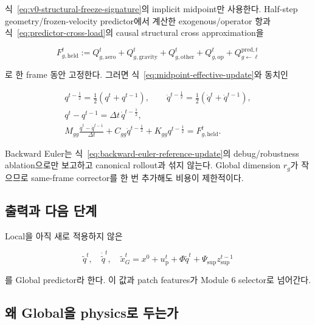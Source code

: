 \documentclass[11pt,a4paper]{article}
\begin{document}
식~\eqref{eq:v0-structural-freeze-signature}의 implicit midpoint만 사용한다.
Half-step geometry/frozen-velocity predictor에서 계산한 exogenous/operator 항과
식~\eqref{eq:predictor-cross-load}의 causal structural cross approximation을

\begin{equation}
  F_{g,\mathrm{held}}^t
  :=Q_{g,\mathrm{aero}}^t+Q_{g,\mathrm{gravity}}^t
  +Q_{g,\mathrm{other}}^t+Q_{g,\mathrm{op}}^t
  +Q_{g\leftarrow\ell}^{\mathrm{pred},t}
\end{equation}

로 한 frame 동안 고정한다. 그러면 식~\eqref{eq:midpoint-effective-update}와 동치인

\begin{equation}
\begin{gathered}
  q^{t-\frac12}=\frac12(q^t+q^{t-1}),
  \qquad
  \dot q^{t-\frac12}=\frac12(\dot q^t+\dot q^{t-1}),\\
  q^t-q^{t-1}=\Delta t\,\dot q^{t-\frac12},\\
  M_{gg}\frac{\dot q^t-\dot q^{t-1}}{\Delta t}
  +C_{gg}\dot q^{t-\frac12}
  +K_{gg}q^{t-\frac12}
  =F_{g,\mathrm{held}}^t.
  \label{eq:global-implicit-midpoint}
\end{gathered}
\end{equation}

Backward Euler는 식~\eqref{eq:backward-euler-reference-update}의 debug/robustness ablation으로만
보고하고 canonical rollout과 섞지 않는다.
Global dimension \(r_g\)가 작으므로 same-frame corrector를 한 번 추가해도 비용이 제한적이다.

\subsection*{출력과 다음 단계}

Local을 아직 새로 적용하지 않은

\begin{equation}
  \widetilde q^t,\quad
  \dot{\widetilde q}^t,\quad
  \widetilde x_G^t
  =x^0+u_{\mathrm p}^t+\Phi\widetilde q^t
  +\Psi_{\mathrm{sup}}z_{\mathrm{sup}}^{t-1}
\end{equation}

를 Global predictor라 한다.
이 값과 patch features가 Module 6 selector로 넘어간다.

\subsection*{왜 Global을 physics로 두는가}
\end{document}
